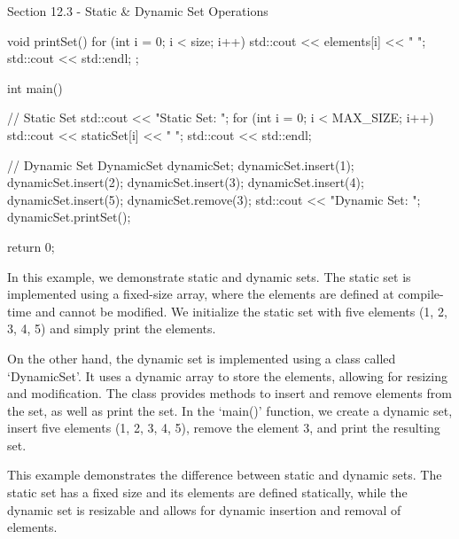 \begin{notes}{Section 12.3 - Static \& Dynamic Set Operations}
\begin{highlight}
\begin{code}[C++]
{            void printSet() {
                for (int i = 0; i < size; i++) {
                    std::cout << elements[i] << " ";
                }
                std::cout << std::endl;
            }
        };
        
        int main() {
            // Static Set
            std::cout << "Static Set: ";
            for (int i = 0; i < MAX_SIZE; i++) {
                std::cout << staticSet[i] << " ";
            }
            std::cout << std::endl;
        
            // Dynamic Set
            DynamicSet dynamicSet;
            dynamicSet.insert(1);
            dynamicSet.insert(2);
            dynamicSet.insert(3);
            dynamicSet.insert(4);
            dynamicSet.insert(5);
            dynamicSet.remove(3);
            std::cout << "Dynamic Set: ";
            dynamicSet.printSet();
        
            return 0;
        }
        \end{code}
        In this example, we demonstrate static and dynamic sets. The static set is implemented using a fixed-size array, where the elements are defined at compile-time and cannot be modified. We initialize the static set with five elements (1, 2, 3, 4, 5) and simply print the elements.
    
        On the other hand, the dynamic set is implemented using a class called `DynamicSet'. It uses a dynamic array to store the elements, allowing for resizing and modification. The class provides methods to insert and remove elements from the set, as well as print the set. In the `main()' function, we create a dynamic set, insert five elements (1, 2, 3, 4, 5), remove the 
        element 3, and print the resulting set.
    
        This example demonstrates the difference between static and dynamic sets. The static set has a fixed size and its elements are defined statically, while the dynamic set is resizable and allows for dynamic insertion and removal of elements.
    \end{highlight}
\end{notes}
